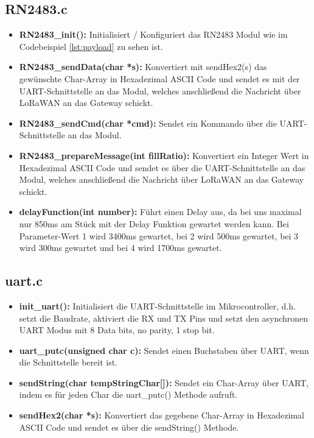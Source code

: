 \subsection{RN2483.c}
\begin{itemize}
    \item \textbf{RN2483\_init():} Initialisiert / Konfiguriert das RN2483 Modul wie im Codebeispiel \ref{lst:payload} zu sehen ist.
    \item \textbf{RN2483\_sendData(char *s):} Konvertiert mit sendHex2(s) das gewünschte Char-Array in Hexadezimal ASCII Code und sendet es mit der UART-Schnittstelle an das Modul, welches anschließend die Nachricht über LoRaWAN an das Gateway schickt.
    \item \textbf{RN2483\_sendCmd(char *cmd):} Sendet ein Kommando über die UART-Schnittstelle an das Modul.
    \item \textbf{RN2483\_prepareMessage(int fillRatio):} Konvertiert ein Integer Wert in Hexadezimal ASCII Code und sendet es über die UART-Schnittstelle an das Modul, welches anschließend die Nachricht über LoRaWAN an das Gateway schickt.
    \item \textbf{delayFunction(int number):} Führt einen Delay aus, da bei uns maximal nur 850ms am Stück mit der Delay Funktion gewartet werden kann. Bei Parameter-Wert 1 wird 3400ms gewartet, bei 2 wird 500ms gewartet, bei 3 wird 300ms gewartet und bei 4 wird 1700ms gewartet. 
\end{itemize}
\subsection{uart.c}
\begin{itemize}
    \item \textbf{init\_uart():} Initialisiert die UART-Schnittstelle im Mikrocontroller, d.h. setzt die Baudrate, aktiviert die RX und TX Pins und setzt den asynchronen UART Modus mit 8 Data bits, no parity, 1 stop bit. 
    \item \textbf{uart\_putc(unsigned char c):} Sendet einen Buchstaben über UART, wenn die Schnittstelle bereit ist.
    \item \textbf{sendString(char tempStringChar[]):} Sendet ein Char-Array über UART, indem es für jeden Char die uart\_putc() Methode aufruft. 
    \item \textbf{sendHex2(char *s):} Konvertiert das gegebene Char-Array in Hexadezimal ASCII Code und sendet es über die sendString() Methode.
\end{itemize}
\newpage


